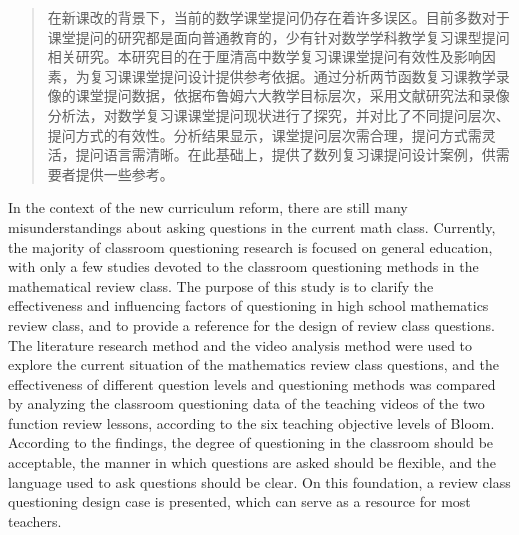 \documentclass{CCNUthesis}
\begin{document}



\frontmatter


\tableofcontents


\begin{abstract}
  在新课改的背景下，当前的数学课堂提问仍存在着许多误区。目前多数对于课堂提问的研究都是面向普通教育的，少有针对数学学科教学复习课型提问相关研究。本研究目的在于厘清高中数学复习课课堂提问有效性及影响因素，为复习课课堂提问设计提供参考依据。通过分析两节函数复习课教学录像的课堂提问数据，依据布鲁姆六大教学目标层次，采用文献研究法和录像分析法，对数学复习课课堂提问现状进行了探究，并对比了不同提问层次、提问方式的有效性。分析结果显示，课堂提问层次需合理，提问方式需灵活，提问语言需清晰。在此基础上，提供了数列复习课提问设计案例，供需要者提供一些参考。
\end{abstract}

\begin{abstract*}
  In the context of the new curriculum reform, there are still many misunderstandings about asking questions in the current math class. Currently, the majority of classroom questioning research is focused on general education, with only a few studies devoted to the classroom questioning methods in the mathematical review class. The purpose of this study is to clarify the effectiveness and influencing factors of questioning in high school mathematics review class, and to provide a reference for the design of review class questions. The literature research method and the video analysis method were used to explore the current situation of the mathematics review class questions, and the effectiveness of different question levels and questioning methods was compared by analyzing the classroom questioning data of the teaching videos of the two function review lessons, according to the six teaching objective levels of Bloom. According to the findings, the degree of questioning in the classroom should be acceptable, the manner in which questions are asked should be flexible, and the language used to ask questions should be clear. On this foundation, a review class questioning design case is presented, which can serve as a resource for most teachers.
\end{abstract*}
\end{document}
